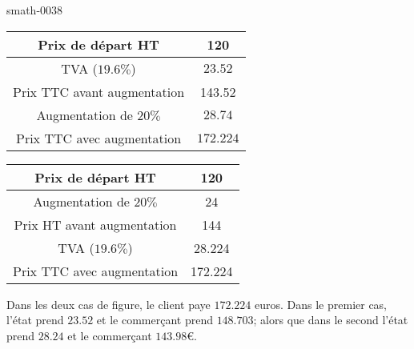 
\begin{corrige}{smath-0038}

    \begin{multicols}{2}
        \begin{tabular}[]{|c||c|}
            \hline
            Prix de départ HT&120\\
            \hline\hline
            TVA (\( 19.6\%\))&\( 23.52\)\\
            \hline
            Prix TTC avant augmentation&143.52\\
            \hline
            Augmentation de \( 20\%\)&\( 28.74\)\\
            \hline
            Prix TTC avec augmentation&\( 172.224\)\\
            \hline
        \end{tabular}

    \columnbreak

        \begin{tabular}[]{|c||c|}
            \hline
            Prix de départ HT&120\\
            \hline\hline
            Augmentation de \( 20\%\)&24\\
            \hline
            Prix HT avant augmentation&144\\
            \hline
            TVA (\( 19.6\%\))&28.224\\
            \hline
            Prix TTC avec augmentation&172.224\\
            \hline
        \end{tabular}
    \end{multicols}

    Dans les deux cas de figure, le client paye \( 172.224\) euros. Dans le premier cas, l'état prend \( 23.52\) et le commerçant prend \( 148.703\); alors que dans le second l'état prend $28.24$ et le commerçant \( 143.98\)€.

\end{corrige}
